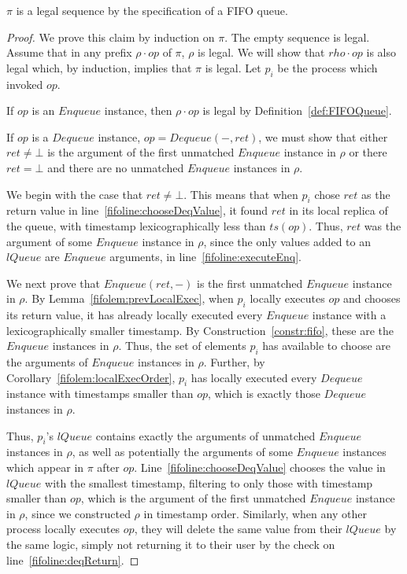 \documentclass[a4paper,anonymous,USenglish]{lipics-v2021}
\theoremstyle{definition}
\begin{document}
\begin{lemma}\label{fifolem:legal}
  $\pi$ is a legal sequence by the specification of a FIFO queue.
\end{lemma}

\begin{proof}
  We prove this claim by induction on $\pi$.  The empty sequence is legal.  Assume that in any prefix $\rho \cdot op$ of $\pi$, $\rho$ is legal.  We will show that $rho \cdot op$ is also legal which, by induction, implies that $\pi$ is legal.  Let $p_i$ be the process which invoked $op$.

  If $op$ is an $Enqueue$ instance, then $\rho \cdot op$ is legal by Definition~\ref{def:FIFOQueue}.

  If $op$ is a $Dequeue$ instance, $op = Dequeue(-,ret)$, we must show that either $ret \neq \bot$ is the argument of the first unmatched $Enqueue$ instance in $\rho$ or there $ret = \bot$ and there are no unmatched $Enqueue$ instances in $\rho$.

  We begin with the case that $ret \neq \bot$.  This means that when $p_i$ chose $ret$ as the return value in line~\ref{fifoline:chooseDeqValue}, it found $ret$ in its local replica of the queue, with timestamp lexicographically less than $ts(op)$.  Thus, $ret$ was the argument of some $Enqueue$ instance in $\rho$, since the only values added to an $lQueue$ are $Enqueue$ arguments, in line~\ref{fifoline:executeEnq}.

  We next prove that $Enqueue(ret,-)$ is the first unmatched $Enqueue$ instance in $\rho$.  By Lemma~\ref{fifolem:prevLocalExec}, when $p_i$ locally executes $op$ and chooses its return value, it has already locally executed every $Enqueue$ instance with a lexicographically smaller timestamp.  By Construction~\ref{constr:fifo}, these are the $Enqueue$ instances in $\rho$.  Thus, the set of elements $p_i$ has available to choose are the arguments of $Enqueue$ instances in $\rho$.  Further, by Corollary~\ref{fifolem:localExecOrder}, $p_i$ has locally executed every $Dequeue$ instance with timestamps smaller than $op$, which is exactly those $Dequeue$ instances in $\rho$.

  Thus, $p_i$'s $lQueue$ contains exactly the arguments of unmatched $Enqueue$ instances in $\rho$, as well as potentially the arguments of some $Enqueue$ instances which appear in $\pi$ after $op$.  Line~\ref{fifoline:chooseDeqValue} chooses the value in $lQueue$ with the smallest timestamp, filtering to only those with timestamp smaller than $op$, which is the argument of the first unmatched $Enqueue$ instance in $\rho$, since we constructed $\rho$ in timestamp order.  Similarly, when any other process locally executes $op$, they will delete the same value from their $lQueue$ by the same logic, simply not returning it to their user by the check on line~\ref{fifoline:deqReturn}.  


\end{proof}
\end{document}
